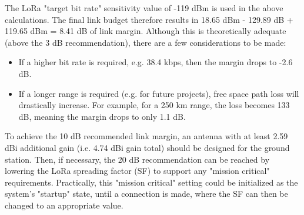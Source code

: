 The LoRa "target bit rate" sensitivity value of -119 dBm is used in the above calculations. The final link budget therefore results in 18.65 dBm - 129.89 dB + 119.65 dBm = 8.41 dB of link margin. Although this is theoretically adequate (above the 3 dB recommendation), there are a few considerations to be made:
\begin{itemize}
    \item If a higher bit rate is required, e.g. 38.4 kbps, then the margin drops to -2.6 dB.
    \item If a longer range is required (e.g. for future projects), free space path loss will drastically increase. For example, for a 250 km range, the loss becomes 133 dB, meaning the margin drops to only 1.1 dB.
\end{itemize}

To achieve the 10 dB recommended link margin, an antenna with at least 2.59 dBi additional gain (i.e. 4.74 dBi gain total) should be designed for the ground station. Then, if necessary, the 20 dB recommendation can be reached by lowering the LoRa spreading factor (SF) to support any "mission critical" requirements. Practically, this "mission critical" setting could be initialized as the system's "startup" state, until a connection is made, where the SF can then be changed to an appropriate value.